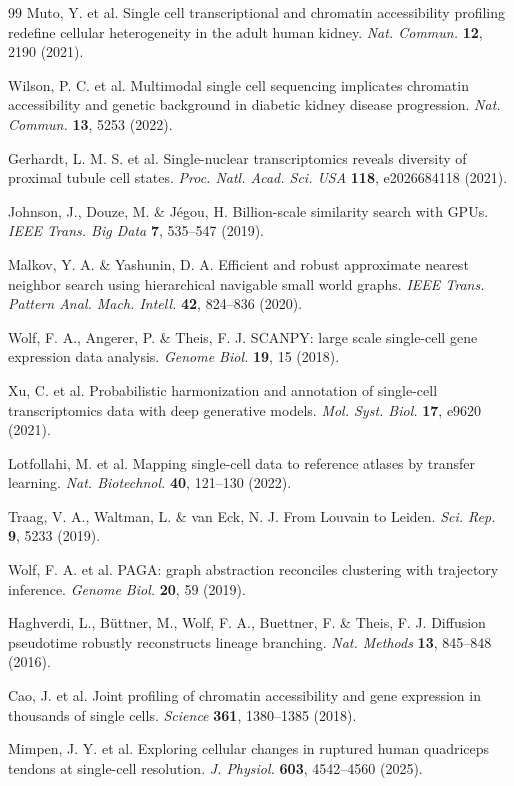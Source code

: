 \documentclass[11pt]{article}
\begin{document}
\begin{thebibliography}{99}
Muto, Y. et al. Single cell transcriptional and chromatin accessibility profiling redefine cellular heterogeneity in the adult human kidney. \textit{Nat. Commun.} \textbf{12}, 2190 (2021).

Wilson, P. C. et al. Multimodal single cell sequencing implicates chromatin accessibility and genetic background in diabetic kidney disease progression. \textit{Nat. Commun.} \textbf{13}, 5253 (2022).

Gerhardt, L. M. S. et al. Single-nuclear transcriptomics reveals diversity of proximal tubule cell states. \textit{Proc. Natl. Acad. Sci. USA} \textbf{118}, e2026684118 (2021).

Johnson, J., Douze, M. \& J\'egou, H. Billion-scale similarity search with GPUs. \textit{IEEE Trans. Big Data} \textbf{7}, 535--547 (2019).

Malkov, Y. A. \& Yashunin, D. A. Efficient and robust approximate nearest neighbor search using hierarchical navigable small world graphs. \textit{IEEE Trans. Pattern Anal. Mach. Intell.} \textbf{42}, 824--836 (2020).

Wolf, F. A., Angerer, P. \& Theis, F. J. SCANPY: large scale single-cell gene expression data analysis. \textit{Genome Biol.} \textbf{19}, 15 (2018).

Xu, C. et al. Probabilistic harmonization and annotation of single-cell transcriptomics data with deep generative models. \textit{Mol. Syst. Biol.} \textbf{17}, e9620 (2021).

Lotfollahi, M. et al. Mapping single-cell data to reference atlases by transfer learning. \textit{Nat. Biotechnol.} \textbf{40}, 121--130 (2022).

Traag, V. A., Waltman, L. \& van Eck, N. J. From Louvain to Leiden. \textit{Sci. Rep.} \textbf{9}, 5233 (2019).

Wolf, F. A. et al. PAGA: graph abstraction reconciles clustering with trajectory inference. \textit{Genome Biol.} \textbf{20}, 59 (2019).

Haghverdi, L., B\"uttner, M., Wolf, F. A., Buettner, F. \& Theis, F. J. Diffusion pseudotime robustly reconstructs lineage branching. \textit{Nat. Methods} \textbf{13}, 845--848 (2016).

Cao, J. et al. Joint profiling of chromatin accessibility and gene expression in thousands of single cells. \textit{Science} \textbf{361}, 1380--1385 (2018).

Mimpen, J. Y. et al. Exploring cellular changes in ruptured human quadriceps tendons at single-cell resolution. \textit{J. Physiol.} \textbf{603}, 4542--4560 (2025).

\end{thebibliography}
\end{document}
